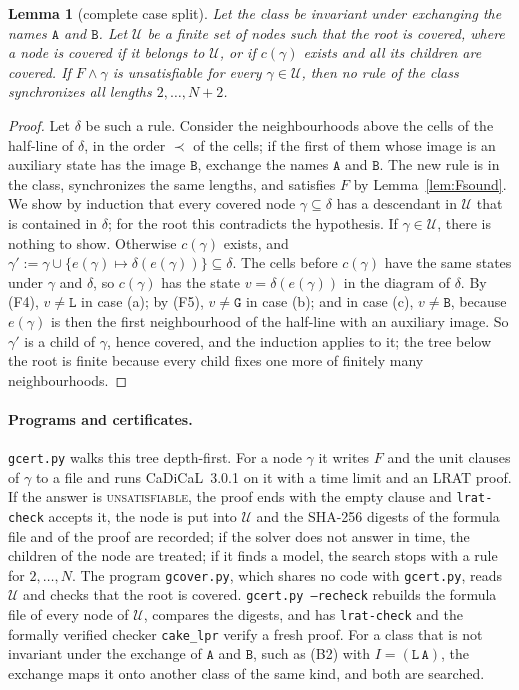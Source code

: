 \documentclass[11pt]{article}
\newtheorem{lemma}{Lemma}
\theoremstyle{remark}
\newcommand{\Lq}{\mathtt{L}}\newcommand{\Gq}{\mathtt{G}}\newcommand{\Aq}{\mathtt{A}}\newcommand{\Bq}{\mathtt{B}}\newcommand{\Fq}{\mathtt{F}}
\begin{document}
\begin{lemma}[complete case split]\label{lem:split}
Let the class be invariant under exchanging the names $\Aq$ and $\Bq$. Let $\mathcal U$ be a finite set of
nodes such that the root is \emph{covered}, where a node is covered if it belongs to $\mathcal U$, or if
$c(\gamma)$ exists and all its children are covered. If $F\wedge\gamma$ is unsatisfiable for every $\gamma\in\mathcal U$, then no rule of the class synchronizes all lengths
$2,\dots,N+2$.
\end{lemma}
\begin{proof}
Let $\delta$ be such a rule. Consider the neighbourhoods above the cells of the half-line of $\delta$, in the
order $\prec$ of the cells; if the first of them whose image is an auxiliary state has the image $\Bq$,
exchange the names $\Aq$ and $\Bq$. The new rule is in the class, synchronizes the same lengths, and satisfies
$F$ by Lemma~\ref{lem:Fsound}. We show by induction that every covered node $\gamma\subseteq\delta$ has a
descendant in $\mathcal U$ that is contained in $\delta$; for the root this contradicts the hypothesis. If
$\gamma\in\mathcal U$, there is nothing to show. Otherwise $c(\gamma)$ exists, and
$\gamma':=\gamma\cup\{e(\gamma)\mapsto\delta(e(\gamma))\}\subseteq\delta$. The cells before $c(\gamma)$ have the
same states under $\gamma$ and $\delta$, so $c(\gamma)$ has the state $v=\delta(e(\gamma))$ in the diagram of
$\delta$. By (F4), $v\ne\Lq$ in case (a); by (F5), $v\ne\Gq$ in case (b); and in case (c), $v\ne\Bq$, because
$e(\gamma)$ is then the first neighbourhood of the half-line with an auxiliary image. So $\gamma'$ is a child
of $\gamma$, hence covered, and the induction applies to it; the tree below the root is finite because every
child fixes one more of finitely many neighbourhoods.
\end{proof}

\paragraph{Programs and certificates.} \texttt{gcert.py} walks this tree depth-first. For a node $\gamma$ it
writes $F$ and the unit clauses of $\gamma$ to a file and runs CaDiCaL~3.0.1 on it with a time limit and an
LRAT proof. If the answer is \textsc{unsatisfiable}, the proof ends with the empty clause and
\texttt{lrat-check} accepts it, the node is put into $\mathcal U$ and the SHA-256 digests of the formula file
and of the proof are recorded; if the solver does not answer in time, the children of the node are treated;
if it finds a model, the search stops with a rule for $2,\dots,N$. The program \texttt{gcover.py}, which
shares no code with \texttt{gcert.py}, reads $\mathcal U$ and checks that the root is covered.
\texttt{gcert.py --recheck} rebuilds the formula file of every node of $\mathcal U$, compares the digests,
and has \texttt{lrat-check} and the formally verified checker \texttt{cake\_lpr} verify a fresh proof.
For a class that is not invariant under the exchange of $\Aq$ and $\Bq$, such as (B2) with $I=(\Lq\,\Aq)$,
the exchange maps it onto another class of the same kind, and both are searched.
\end{document}

